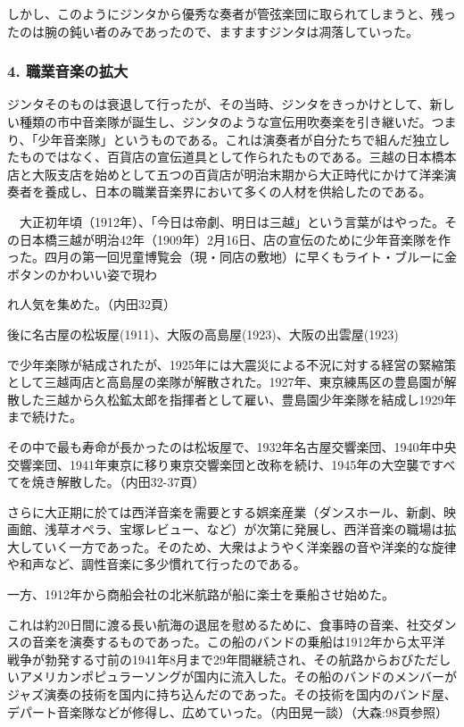 しかし、このようにジンタから優秀な奏者が管弦楽団に取られてしまうと、残ったのは腕の鈍い者のみであったので、ますますジンタは凋落していった。

\subsubsection{4. 職業音楽の拡大}

ジンタそのものは衰退して行ったが、その当時、ジンタをきっかけとして、新しい種類の市中音楽隊が誕生し、ジンタのような宣伝用吹奏楽を引き継いだ。つまり、「少年音楽隊」というものである。これは演奏者が自分たちで組んだ独立したものではなく、百貨店の宣伝道具として作られたものである。三越の日本橋本店と大阪支店を始めとして五つの百貨店が明治末期から大正時代にかけて洋楽演奏者を養成し、日本の職業音楽界において多くの人材を供給したのである。

\begin{gquote}
　大正初年頃（1912年）、「今日は帝劇、明日は三越」という言葉がはやった。その日本橋三越が明治42年（1909年）2月16日、店の宣伝のために少年音楽隊を作った。四月の第一回児童博覧会（現・同店の敷地）に早くもライト・ブルーに金ボタンのかわいい姿で現わ
\end{gquote}

\begin{gquote}
れ人気を集めた。（内田32頁）
\end{gquote}

後に名古屋の松坂屋(1911)、大阪の高島屋(1923)、大阪の出雲屋(1923)

で少年楽隊が結成されたが、1925年には大震災による不況に対する経営の緊縮策として三越両店と高島屋の楽隊が解散された。1927年、東京練馬区の豊島園が解散した三越から久松鉱太郎を指揮者として雇い、豊島園少年楽隊を結成し1929年まで続けた。

その中で最も寿命が長かったのは松坂屋で、1932年名古屋交響楽団、1940年中央交響楽団、1941年東京に移り東京交響楽団と改称を続け、1945年の大空襲ですべてを焼き解散した。（内田32-37頁）

さらに大正期に於ては西洋音楽を需要とする娯楽産業（ダンスホール、新劇、映画館、浅草オペラ、宝塚レビュー、など）が次第に発展し、西洋音楽の職場は拡大していく一方であった。そのため、大衆はようやく洋楽器の音や洋楽的な旋律や和声など、調性音楽に多少慣れて行ったのである。

一方、1912年から商船会社の北米航路が船に楽士を乗船させ始めた。

これは約20日間に渡る長い航海の退屈を慰めるために、食事時の音楽、社交ダンスの音楽を演奏するものであった。この船のバンドの乗船は1912年から太平洋戦争が勃発する寸前の1941年8月まで29年間継続され、その航路からおびただしいアメリカンポピュラーソングが国内に流入した。その船のバンドのメンバーがジャズ演奏の技術を国内に持ち込んだのであった。その技術を国内のバンド屋、デパート音楽隊などが修得し、広めていった。（内田晃一談）（大森:98頁参照）

